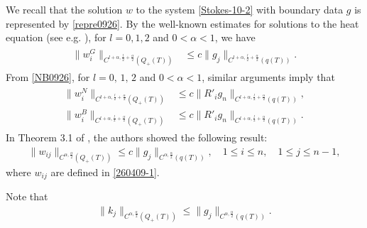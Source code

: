 \documentclass{amsart}
\numberwithin{equation}{section}
\newcommand {\al}{\alpha}
\begin{document}
We recall that the solution $w$ to the system \eqref{Stokes-10-2} with boundary data $g$ is represented by \eqref{repre0926}.
By the well-known estimates for solutions to the heat equation (see e.g. \cite[Section 2 of Chapter IV]{LS}), for $l=0,1,2$ and $0<\alpha<1$, we have
\begin{align*}
\begin{split}
\| w^G_i \|_{C^{l+\al, \frac{l}2 +\frac{\al}2}(Q_+(T))} &\leq c \| g_j \|_{C^{l+\al, \frac{l}2 +\frac{\al}2}(q(T))}.
\end{split}
\end{align*}
From \eqref{NB0926}, for $l = 0, \, 1, \, 2$ and $0 < \al < 1$, similar arguments imply that
\begin{align*}
\begin{split}
\| w^N_i \|_{C^{l+\al, \frac{l}2 +\frac{\al}2}(Q_+(T))} &\leq c \| R'_i g_n \|_{C^{l+\al, \frac{l}2 +\frac{\al}2}(q(T))}, \\
\| w^B_i \|_{C^{l+\al, \frac{l}2 +\frac{\al}2}(Q_+(T))} &\leq c \| R'_i g_n \|_{C^{l+\al, \frac{l}2 +\frac{\al}2}(q(T))}.
\end{split}
\end{align*}
In Theorem 3.1 of \cite{CJ2}, the authors showed the following result:
\begin{align*}%
\| w_{ij} \|_{C^{\al, \frac{\al}2}(Q_+(T))} \leq c \| g_j \|_{C^{\al, \frac{\al}2}(q(T))}, \quad 1 \leq i \leq n, \quad 1 \leq j \leq n-1,
\end{align*} 
where $w_{ij}$ are defined in \eqref{260409-1}.
 
 
 

Note that 
\begin{align}\label{1127-2}
\| k_j \|_{C^{\al, \frac{\al}2}(Q_+(T))} \leq \| g_j \|_{C^{\al, \frac{\al}2}(q(T))}.
\end{align}
\end{document}
